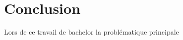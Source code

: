 \chapter{Conclusion}
\label{ch:conclusion}
Lors de ce travail de bachelor la problématique principale 